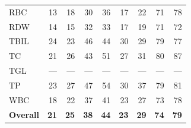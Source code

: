\begin{table}[ht]
\begin{tabular}{lrrrrrrrr}
RBC & 13 & 18 & 30 & 36 & 17 & 22 & 71 & 78 \\
RDW & 14 & 15 & 32 & 33 & 17 & 19 & 71 & 72 \\
TBIL & 24 & 23 & 46 & 44 & 30 & 29 & 79 & 77 \\
TC & 21 & 26 & 43 & 51 & 27 & 31 & 80 & 87 \\
TGL & --- & --- & --- & --- & --- & --- & --- & --- \\
TP & 23 & 27 & 47 & 54 & 30 & 37 & 79 & 81 \\
WBC & 18 & 22 & 37 & 41 & 23 & 27 & 73 & 78 \\
\midrule
\textbf{Overall} & \textbf{21} & \textbf{25} & \textbf{38} & \textbf{44} & \textbf{23} & \textbf{29} & \textbf{74} & \textbf{79} \\
\bottomrule
\end{tabular}
\label{tab:12_eval_interpretable_chs}
\end{table}